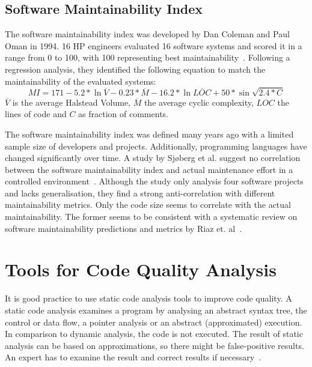 \subsection{Software Maintainability Index}
The software maintainability index was developed by Dan Coleman and Paul Oman in 1994. 16 HP engineers evaluated 16 software systems and scored it in a range from 0 to 100, with 100 representing best maintainability~\cite{coleman_using_1994}. 
Following a regression analysis, they identified the following equation to match the maintainability of the evaluated systems:
\begin{displaymath}
MI = 171 - 5.2 *\ln{\overline{V}} - 0.23 * \overline{M} - 16.2 * \ln{\overline{LOC}} + 50 * \sin{\sqrt{2.4 * C}}
\end{displaymath}
$\overline{V}$ is the average Halstead Volume, $\overline{M}$ the average cyclic complexity, $LOC$ the lines of code and $C$ as fraction of comments.

The software maintainability index was defined many years ago with a limited sample size of developers and projects. Additionally, programming languages have changed significantly over time. A study by Sjøberg et al. suggest no correlation between the software maintainability index and actual maintenance effort in a controlled environment~\cite{sjoberg_questioning_nodate}. Although the study only analysis four software projects and lacks generalisation, they find a strong anti-correlation with different maintainability metrics. Only the code size seems to correlate with the actual maintainability. The former seems to be consistent with a systematic review on software maintainability predictions and metrics by Riaz et. al~\cite{riaz_systematic_2009}.



\section{Tools for Code Quality Analysis}\label{sec:tool_comparison}
It is good practice to use static code analysis tools to improve code quality. A static code analysis examines a program by analysing an abstract syntax tree, the control or data flow, a pointer analysis or an abstract (approximated) execution. In comparison to dynamic analysis, the code is not executed. The result of static analysis can be based on approximations, so there might be false-positive results. An expert has to examine the result and correct results if necessary~\cite{prahofer_static_2017}.

